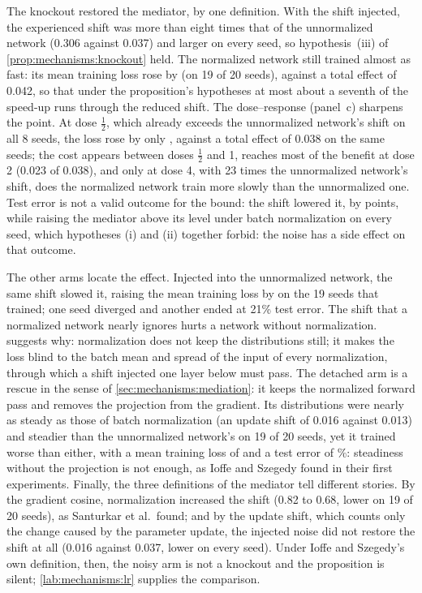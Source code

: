 \begin{refsection}
The knockout restored the mediator, by one definition. With the shift injected, the experienced shift was more than eight times that of the unnormalized network (0.306 against 0.037) and larger on every seed, so hypothesis~(iii) of \cref{prop:mechanisms:knockout} held. The normalized network still trained almost as fast: its mean training loss rose by  (on 19 of 20 seeds), against a total effect of 0.042, so that under the proposition's hypotheses at most about a seventh of the speed-up runs through the reduced shift. The dose--response (panel~c) sharpens the point. At dose $\frac12$, which already exceeds the unnormalized network's shift on all 8 seeds, the loss rose by only , against a total effect of 0.038 on the same seeds; the cost appears between doses $\frac12$ and 1, reaches most of the benefit at dose 2 (0.023 of 0.038), and only at dose 4, with 23 times the unnormalized network's shift, does the normalized network train more slowly than the unnormalized one. Test error is not a valid outcome for the bound: the shift lowered it, by  points, while raising the mediator above its level under batch normalization on every seed, which hypotheses (i) and (ii) together forbid: the noise has a side effect on that outcome.

The other arms locate the effect. Injected into the unnormalized network, the same shift slowed it, raising the mean training loss by  on the 19 seeds that trained; one seed diverged and another ended at 21\% test error. The shift that a normalized network nearly ignores hurts a network without normalization.  suggests why: normalization does not keep the distributions still; it makes the loss blind to the batch mean and spread of the input of every normalization, through which a shift injected one layer below must pass. The detached arm is a rescue in the sense of \cref{sec:mechanisms:mediation}: it keeps the normalized forward pass and removes the projection from the gradient. Its distributions were nearly as steady as those of batch normalization (an update shift of 0.016 against 0.013) and steadier than the unnormalized network's on 19 of 20 seeds, yet it trained worse than either, with a mean training loss of  and a test error of \%: steadiness without the projection is not enough, as Ioffe and Szegedy found in their first experiments. Finally, the three definitions of the mediator tell different stories. By the gradient cosine, normalization increased the shift (0.82 to 0.68, lower on 19 of 20 seeds), as Santurkar et al.\ found; and by the update shift, which counts only the change caused by the parameter update, the injected noise did not restore the shift at all (0.016 against 0.037, lower on every seed). Under Ioffe and Szegedy's own definition, then, the noisy arm is not a knockout and the proposition is silent; \cref{lab:mechanisms:lr} supplies the comparison.


\end{refsection}
